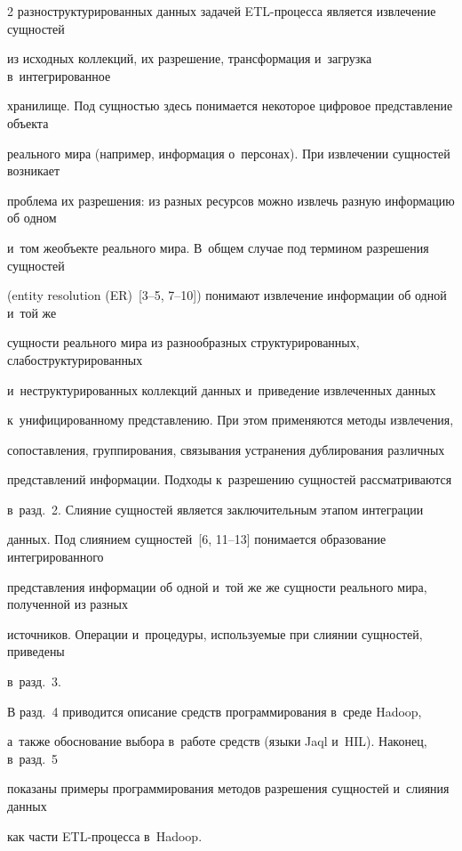 \begin{multicols}{2}
разноструктурированных данных задачей ETL-про\-цес\-са является извлечение сущностей

из исходных коллекций, их разрешение, трансформация и~загрузка в~интегрированное

хранилище. Под сущностью здесь понимается некоторое цифровое представление объекта\linebreak

реального мира (например, информация о~персонах). При извлечении сущностей возникает

проб\-ле\-ма их разрешения: из разных ресурсов можно извлечь разную информацию об одном

и~том же\linebreak объекте реального мира. В~общем случае под термином разрешения сущностей

(entity resolution (ER)~[3--5, 7--10]) понимают извлечение информации об одной и~той же

сущности реального мира из разнообразных структурированных, слабоструктурированных

и~неструктурированных коллекций данных и~приведение извлеченных данных

к~унифицированному представлению. При этом применяются методы извлечения,

сопоставления, группирования, связывания устранения дублирования различных

представлений информации. Подходы к~разрешению сущностей рассматриваются

в~разд.~2. Слияние сущностей является заключительным этапом интеграции

данных. Под слиянием сущностей~[6, 11--13] понимается образование интегрированного

представления информации об одной и~той же же сущности реального мира, полученной из разных

источников. Операции и~процедуры, ис\-поль\-зу\-емые при слиянии сущностей, приведены

в~разд.~3.



  В разд.~4 приводится описание средств программирования в~среде Hadoop,

а~также обоснование выбора в~работе средств (языки Jaql и~HIL). Наконец, в~разд.~5

показаны примеры программирования методов разрешения сущностей и~слияния данных

как части ETL-про\-цес\-са в~Hadoop.




\end{multicols}

